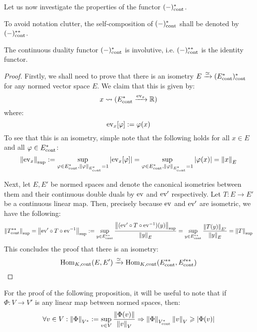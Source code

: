         Let us now investigate the properties of the functor $(-)^*_{\mathrm{cont}}$.
        \begin{convention}
            To avoid notation clutter, the self-composition of $(-)^*_{\mathrm{cont}}$ shall be denoted by $(-)^{**}_{\mathrm{cont}}$.
        \end{convention}
        \begin{lemma} \label{lemma: continuous_duality_involutive}
            The continuous duality functor $(-)^*_{\mathrm{cont}}$ is involutive, i.e. $(-)^{**}_{\mathrm{cont}}$ is the identity functor. 
        \end{lemma}
            \begin{proof}
                Firstly, we shall need to prove that there is an isometry $E \xrightarrow[]{\simeq} ( E^*_{\mathrm{cont}} )^*_{\mathrm{cont}}$ for any normed vector space $E$. We claim that this is given by:
                    $$x \leadsto (E^*_{\mathrm{cont}} \xrightarrow[]{\mathrm{ev}_x} \mathbb{R})$$
                where:
                    $$\mathrm{ev}_x[\varphi] := \varphi(x)$$
                To see that this is an isometry, simple note that the following holds for all $x \in E$ and all $\varphi \in E^*_{\mathrm{cont}}$:
                    $$\left\| {\mathrm{ev}_x} \right\|_{\sup} := \sup_{\varphi \in E^*_{\mathrm{cont}}, \left\| {\varphi} \right\|_{E^*_{\mathrm{cont}}} = 1} |\mathrm{ev}_x[\varphi]| = \sup_{\varphi \in E^*_{\mathrm{cont}}, \left\| {\varphi} \right\|_{E^*_{\mathrm{cont}}} = 1} \left\lvert {\varphi(x)} \right\rvert = \left\| {x} \right\|_E$$

                Next, let $E, E'$ be normed spaces and denote the canonical isometries between them and their continuous double duals by $\mathrm{ev}$ and $\mathrm{ev}'$ respectively. Let $T: E \to E'$ be a continuous linear map. Then, precisely because $\mathrm{ev}$ and $\mathrm{ev}'$ are isometric, we have the following:
                    $$\left\| { T^{**}_{\mathrm{cont}} } \right\|_{\sup} = \left\| { \mathrm{ev}' \circ T \circ \mathrm{ev}^{-1} } \right\|_{\sup} := \sup_{y \in E^{**}_{\mathrm{cont}}} \frac{ \left\| { (\mathrm{ev}' \circ T \circ \mathrm{ev}^{-1})(y) } \right\|_{\sup} }{\left\| {y} \right\|_E} = \sup_{y \in E^{**}_{\mathrm{cont}}} \frac{\left\| {T(y)} \right\|_{E'}}{\left\| {y} \right\|_E} = \left\| {T} \right\|_{\sup}$$
                This concludes the proof that there is an isometry:
                    $$\mathrm{Hom}_{K, \mathrm{cont}}(E, E') \xrightarrow[]{\simeq} \mathrm{Hom}_{K, \mathrm{cont}}(E^{**}_{\mathrm{cont}}, E'^{**}_{\mathrm{cont}})$$
            \end{proof}
        For the proof of the following proposition, it will be useful to note that if $\Phi: V \to V'$ is any linear map between normed spaces, then:
            $$\forall v \in V: \left\| {\Phi} \right\|_{V^*} := \sup_{v \in V} \frac{\left\| {\Phi(v)} \right\|}{\left\| {v} \right\|_V} \Rightarrow \left\| {\Phi} \right\|_{V^*_{\mathrm{cont}}} \left\| {v} \right\|_V \geqslant \left\lvert {\Phi(v)} \right\rvert$$

